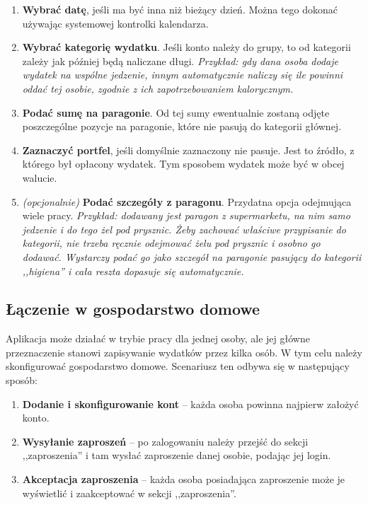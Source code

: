 \documentclass[12pt,a4paper,twoside,titlepage,openright]{book}
\begin{document}
\begin{enumerate}
\item \textbf{Wybrać datę}, jeśli ma być inna niż bieżący dzień. Można tego dokonać używając systemowej kontrolki kalendarza.
\item \textbf{Wybrać kategorię wydatku}. Jeśli konto należy do grupy, to od kategorii zależy jak później będą naliczane długi. \textit{Przykład: gdy dana osoba dodaje wydatek na wspólne jedzenie, innym automatycznie naliczy się ile powinni oddać tej osobie, zgodnie z ich zapotrzebowaniem kalorycznym.}
\item \textbf{Podać sumę na paragonie}. Od tej sumy ewentualnie zostaną odjęte poszczególne pozycje na paragonie, które nie pasują do kategorii głównej.
\item \textbf{Zaznaczyć portfel}, jeśli domyślnie zaznaczony nie pasuje. Jest to źródło, z którego był opłacony wydatek. Tym sposobem wydatek może być w obcej walucie.
\item \textit{(opcjonalnie)} \textbf{Podać szczegóły z paragonu}. Przydatna opcja odejmująca wiele pracy. \textit{Przykład: dodawany jest paragon z supermarketu, na nim samo jedzenie i do tego żel pod prysznic. Żeby zachować właściwe przypisanie do kategorii, nie trzeba ręcznie odejmować żelu pod prysznic i osobno go dodawać. Wystarczy podać go jako szczegół na paragonie pasujący do kategorii ,,higiena'' i cała reszta dopasuje się automatycznie.}
\end{enumerate}

\subsection{Łączenie w gospodarstwo domowe}

Aplikacja może działać w trybie pracy dla jednej osoby, ale jej główne przeznaczenie stanowi zapisywanie wydatków przez kilka osób. W tym celu należy skonfigurować gospodarstwo domowe. Scenariusz ten odbywa się w następujący sposób:

\begin{enumerate}
\item \textbf{Dodanie i skonfigurowanie kont} -- każda osoba powinna najpierw założyć konto.
\item \textbf{Wysyłanie zaproszeń} -- po zalogowaniu należy przejść do sekcji ,,zaproszenia'' i tam wysłać zaproszenie danej osobie, podając jej login.
\item \textbf{Akceptacja zaproszenia} -- każda osoba posiadająca zaproszenie może je wyświetlić i zaakceptować w sekcji ,,zaproszenia''.  
\end{enumerate}
\end{document}
